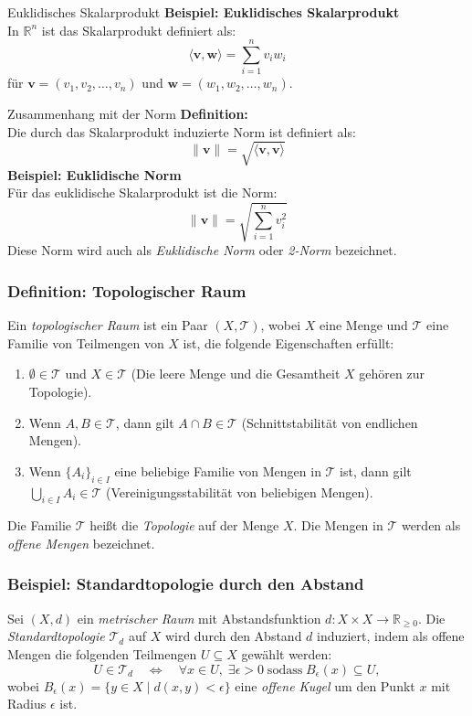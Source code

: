 \documentclass{beamer}
\begin{document}
  \begin{frame}{Euklidisches Skalarprodukt}
      \textbf{Beispiel: Euklidisches Skalarprodukt} \\
      In \( \mathbb{R}^n \) ist das Skalarprodukt definiert als:
      \[
      \langle \mathbf{v}, \mathbf{w} \rangle = \sum_{i=1}^n v_i w_i
      \]
      für \( \mathbf{v} = (v_1, v_2, \dots, v_n) \) und \( \mathbf{w} = (w_1, w_2, \dots, w_n) \).
  \end{frame}
  
  \begin{frame}{Zusammenhang mit der Norm}
      \textbf{Definition:} \\
      Die durch das Skalarprodukt induzierte Norm ist definiert als:
      \[
      \|\mathbf{v}\| = \sqrt{\langle \mathbf{v}, \mathbf{v} \rangle}
      \]
      \textbf{Beispiel: Euklidische Norm} \\
      Für das euklidische Skalarprodukt ist die Norm:
      \[
      \|\mathbf{v}\| = \sqrt{\sum_{i=1}^n v_i^2}
      \]
      Diese Norm wird auch als \textit{Euklidische Norm} oder \textit{2-Norm} bezeichnet.
  \end{frame}
  


  \begin{frame}
    \frametitle{Definition: Topologischer Raum}
    Ein \emph{topologischer Raum} ist ein Paar $(X, \mathcal{T})$, wobei $X$ eine Menge und $\mathcal{T}$ eine Familie von Teilmengen von $X$ ist, die folgende Eigenschaften erfüllt:
    \begin{enumerate}
        \item $\emptyset \in \mathcal{T}$ und $X \in \mathcal{T}$ (Die leere Menge und die Gesamtheit $X$ gehören zur Topologie).
        \item Wenn $A, B \in \mathcal{T}$, dann gilt $A \cap B \in \mathcal{T}$ (Schnittstabilität von endlichen Mengen).
        \item Wenn $\{A_i\}_{i \in I}$ eine beliebige Familie von Mengen in $\mathcal{T}$ ist, dann gilt $\bigcup_{i \in I} A_i \in \mathcal{T}$ (Vereinigungsstabilität von beliebigen Mengen).
    \end{enumerate}
    Die Familie $\mathcal{T}$ heißt die \emph{Topologie} auf der Menge $X$. Die Mengen in $\mathcal{T}$ werden als \emph{offene Mengen} bezeichnet.
\end{frame}


\begin{frame}
    \frametitle{Beispiel: Standardtopologie durch den Abstand}
    Sei $(X, d)$ ein \emph{metrischer Raum} mit Abstandsfunktion $d: X \times X \rightarrow \mathbb{R}_{\geq 0}$.
    Die \emph{Standardtopologie} $\mathcal{T}_d$ auf $X$ wird durch den Abstand $d$ induziert, indem als offene Mengen die folgenden Teilmengen $U \subseteq X$ gewählt werden:
    \[
    U \in \mathcal{T}_d \quad \Leftrightarrow \quad \forall x \in U, \; \exists \epsilon > 0 \; \text{sodass} \; B_\epsilon(x) \subseteq U,
    \]
    wobei $B_\epsilon(x) = \{ y \in X \mid d(x, y) < \epsilon \}$ eine \emph{offene Kugel} um den Punkt $x$ mit Radius $\epsilon$ ist.
\end{frame}
\end{document}
